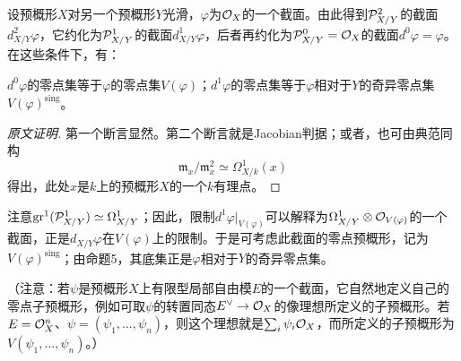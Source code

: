 设预概形$X$对另一个预概形$Y$光滑，$\varphi$为$\mathcal O_X$的一个截面。由此得到$\mathcal P^2_{X/Y}$的截面$d^2_{X/Y}\varphi$，它约化为$\mathcal P^1_{X/Y}$的截面$d^1_{X/Y}\varphi$，后者再约化为$\mathcal P^0_{X/Y}=\mathcal O_X$的截面$d^0\varphi=\varphi$。在这些条件下，有：

$d^0\varphi$的零点集等于$\varphi$的零点集$V(\varphi)$；$d^1\varphi$的零点集等于$\varphi$相对于$Y$的奇异零点集$V(\varphi)^{\mathrm{sing}}$。
\begin{proof}[原文证明]
第一个断言显然。第二个断言就是Jacobian判据；或者，也可由典范同构
\[
 \mathfrak m_x/\mathfrak m_x^2\simeq\Omega^1_{X/k}(x)
\]
得出，此处$x$是$k$上的预概形$X$的一个$k$有理点。
\end{proof}

注意$\operatorname{gr}^1(\mathcal P^1_{X/Y})\simeq\Omega^1_{X/Y}$；因此，限制$d^1\varphi|_{V(\varphi)}$可以解释为$\Omega^1_{X/Y}\otimes\mathcal O_{V(\varphi)}$的一个截面，正是$d_{X/Y}\varphi$在$V(\varphi)$上的限制。于是可考虑此截面的零点预概形，记为$V(\varphi)^{\mathrm{sing}}$；由命题5，其底集正是$\varphi$相对于$Y$的奇异零点集。

（注意：若$\psi$是预概形$X$上有限型局部自由模$E$的一个截面，它自然地定义自己的零点子预概形，例如可取$\psi$的转置同态$E^\vee\to\mathcal O_X$的像理想所定义的子预概形。若$E=\mathcal O_X^n$、$\psi=(\psi_1,\ldots,\psi_n)$，则这个理想就是$\sum_i\psi_i\mathcal O_X$，而所定义的子预概形为$V(\psi_1,\ldots,\psi_n)$。）

